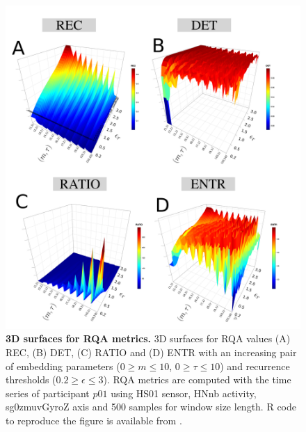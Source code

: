 \begin{figure}[!ht]
\centering
\includegraphics[width=1.0\textwidth]{rqas_w500}
    \caption{
	{\bf 3D surfaces for RQA metrics.}
	3D surfaces for RQA values (A) REC, (B) DET, (C) RATIO and 
	(D) ENTR with an increasing pair of embedding parameters 
	($0 \ge m \le 10$, $0 \ge \tau \le 10$) 
	and recurrence thresholds ($ 0.2 \ge \epsilon \le 3 $).
	RQA metrics are computed with the time series of participant $p01$ using 
	HS01 sensor, HNnb activity, sg0zmuvGyroZ axis and 500 samples 
	for window size length.
        R code to reproduce the figure is available from \cite{hwum2018}.
	}
\label{fig:topo_rqas_w500}
\end{figure}


